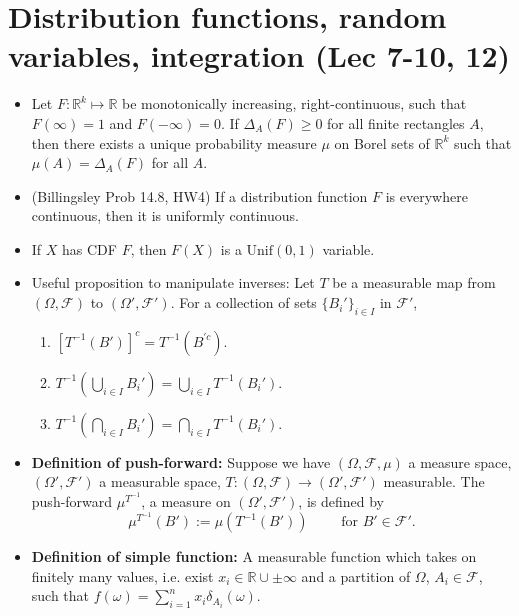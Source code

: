 \documentclass[twoside]{article}
\newcommand{\dis}{\displaystyle}
\newcommand\bbR{\mathbb{R}}
\newcommand\calF{\mathcal{F}}
\newcommand\dlt{\delta}
\newcommand\Dlt{\Delta}
\newcommand\om{\omega}
\newcommand\Om{\Omega}
\begin{document}
\section*{Distribution functions, random variables, integration (Lec 7-10, 12)}
\begin{itemize}
\item Let $F: \bbR^k \mapsto \bbR$ be monotonically increasing, right-continuous, such that $F(\infty) = 1$ and $F(-\infty) = 0$. If $\Dlt_A (F) \geq 0$ for all finite rectangles $A$, then there exists a unique probability measure $\mu$ on Borel sets of $\bbR^k$ such that $\mu(A) = \Dlt_A(F)$ for all $A$.

\item (Billingsley Prob 14.8, HW4) If a distribution function $F$ is everywhere continuous, then it is uniformly continuous.

\item If $X$ has CDF $F$, then $F(X)$ is a $\text{Unif}(0,1)$ variable.

\item Useful proposition to manipulate inverses: Let $T$ be a measurable map from $(\Om, \calF)$ to $(\Om', \calF')$. For a collection of sets $\{B_i'\}_{i \in I}$ in $\calF'$,
\begin{enumerate}
\item $[T^{-1}(B')]^c = T^{-1}(B^{\prime c})$.
\item $T^{-1}\left(\displaystyle\bigcup_{i \in I} B_i'\right) = \displaystyle\bigcup_{i \in I} T^{-1}(B_i')$.
\item $T^{-1}\left(\displaystyle\bigcap_{i \in I} B_i'\right) = \displaystyle\bigcap_{i \in I} T^{-1}(B_i')$.
\end{enumerate}

\item \textbf{Definition of push-forward:} Suppose we have $(\Om, \calF, \mu)$ a measure space, $(\Om', \calF')$ a measurable space, $T: (\Om, \calF) \rightarrow (\Om', \calF')$ measurable. The push-forward $\mu^{T^{-1}}$, a measure on $(\Om', \calF')$, is defined by 
\begin{equation*} \mu^{T^{-1}}(B') := \mu(T^{-1}(B')) \qquad \text{ for } B' \in \calF'. \end{equation*}

\item \textbf{Definition of simple function:} A measurable function which takes on finitely many values, i.e. exist $x_i \in \bbR \cup \pm \infty$ and a partition of $\Om$, $A_i \in \calF$, such that $f(\om) = \dis\sum_{i=1}^n x_i \dlt_{A_i}(\om)$.


\end{itemize}
\end{document}
